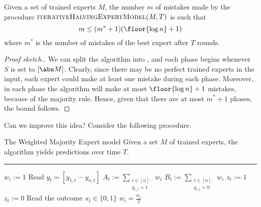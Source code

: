 \documentclass[a4paper, 12pt]{report}
\begin{document}
    \begin{framedthm}{}
        Given a set of trained experts $M$, the number $m$ of mistakes made by the procedure $\textsc{iterativeHalvingExpertModel}(M, T)$ is such that $$m \le (m^* + 1)(\floor{\log n} + 1)$$ where $m^*$ is the number of mistakes of the best expert after $T$ rounds.
    \end{framedthm}
    
    \begin{proof}[Proof sketch.]
        We can split the algorithm into , and each phase begins whenever $S$ is set to $[\abs M]$. Clearly, since there may be no perfect trained experts in the input, each expert could make at least one mistake during each phase. Moreover, in each phase the algorithm will make at most $\floor{\log n} + 1$ mistakes, because of the majority rule. Hence, given that there are at most $m^* + 1$ phases, the bound follows.
    \end{proof}

    Can we improve this idea? Consider the following procedure.

    \begin{framedalgo}{The Weighted Majority Expert model}
        Given a set $M$ of trained experts, the algorithm yields predictions over time $T$. \\
        \hrule

        \quad
        \begin{algorithmic}[1]
                    \State $w_i := 1$
                \EndFor
                    \State Read $y_t = [y_{1, t} \ \cdots \ y_{n, t}]$
                    \State $A_t := \sum\limits_{\substack{i \in [n] : \\ y_{i , t} = 1}}{w_i}$
                    \State $B_t := \sum\limits_{\substack{i \in [n] : \\ y_{i , t} = 0}}{w_i}$
                        \State $z_t := 1$
                    \Else
                        \State $z_t := 0$
                    \EndIf
                    \State Read the outcome $x_t \in \{0, 1\}$
                                \State $w_i = \tfrac{w_i}{2}$
                            \EndIf
                        \EndFor
                    \EndIf
                \EndFor
            \EndFunction
        \end{algorithmic}
    \end{framedalgo}
    
\end{document}
